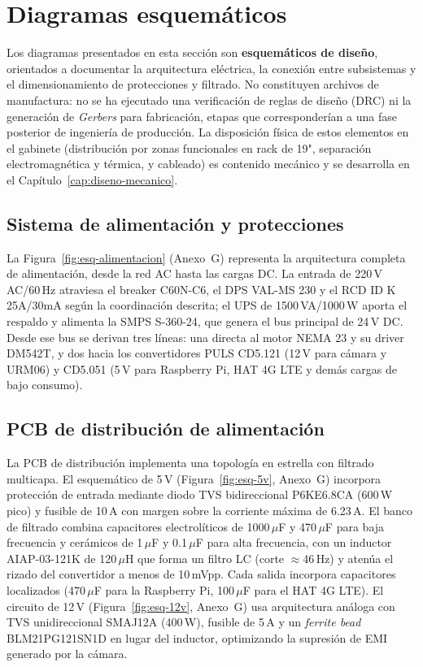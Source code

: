 \section{Diagramas esquemáticos}\label{sec:esquematicos}

Los diagramas presentados en esta sección son \textbf{esquemáticos de diseño}, orientados a documentar la
arquitectura eléctrica, la conexión entre subsistemas y el dimensionamiento de protecciones y filtrado. No
constituyen archivos de manufactura: no se ha ejecutado una verificación de reglas de diseño (DRC) ni la
generación de \textit{Gerbers} para fabricación, etapas que corresponderían a una fase posterior de
ingeniería de producción. La disposición física de estos elementos en el gabinete (distribución por zonas
funcionales en rack de 19", separación electromagnética y térmica, y cableado) es contenido mecánico y se
desarrolla en el Capítulo~\ref{cap:diseno-mecanico}.

\subsection{Sistema de alimentación y protecciones}

La Figura~\ref{fig:esq-alimentacion} (Anexo~G) representa la arquitectura completa de alimentación, desde la
red AC hasta las cargas DC. La entrada de 220\,V AC/60\,Hz atraviesa el breaker C60N-C6, el DPS VAL-MS 230 y
el RCD ID K 25A/30mA según la coordinación descrita; el UPS de 1500\,VA/1000\,W aporta el respaldo y alimenta
la SMPS S-360-24, que genera el bus principal de 24\,V DC. Desde ese bus se derivan tres líneas: una directa
al motor NEMA 23 y su driver DM542T, y dos hacia los convertidores PULS CD5.121 (12\,V para cámara y URM06) y
CD5.051 (5\,V para Raspberry Pi, HAT 4G LTE y demás cargas de bajo consumo).

\subsection{PCB de distribución de alimentación}

La PCB de distribución implementa una topología en estrella con filtrado multicapa. El esquemático de 5\,V
(Figura~\ref{fig:esq-5v}, Anexo~G) incorpora protección de entrada mediante diodo TVS bidireccional
P6KE6.8CA (600\,W pico) y fusible de 10\,A con margen sobre la corriente máxima de 6.23\,A. El banco de
filtrado combina capacitores electrolíticos de 1000\,\ensuremath{\mu}F y 470\,\ensuremath{\mu}F para baja
frecuencia y cerámicos de 1\,\ensuremath{\mu}F y 0.1\,\ensuremath{\mu}F para alta frecuencia, con un inductor
AIAP-03-121K de 120\,\ensuremath{\mu}H que forma un filtro LC (corte $\approx$46\,Hz) y atenúa el rizado del
convertidor a menos de 10\,mVpp. Cada salida incorpora capacitores localizados (470\,\ensuremath{\mu}F para
la Raspberry Pi, 100\,\ensuremath{\mu}F para el HAT 4G LTE). El circuito de 12\,V
(Figura~\ref{fig:esq-12v}, Anexo~G) usa arquitectura análoga con TVS unidireccional SMAJ12A (400\,W), fusible
de 5\,A y un \textit{ferrite bead} BLM21PG121SN1D en lugar del inductor, optimizando la supresión de EMI
generado por la cámara.

